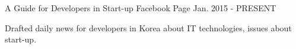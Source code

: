 

\begin{cventries}

	{A Guide for Developers in Start-up} %
	{Facebook Page} %
	{Jan. 2015 - PRESENT} %
	{
		\begin{cvitems} %
			\item {Drafted daily news for developers in Korea about IT technologies, issues about start-up.}
		\end{cvitems}
	}

\end{cventries}

